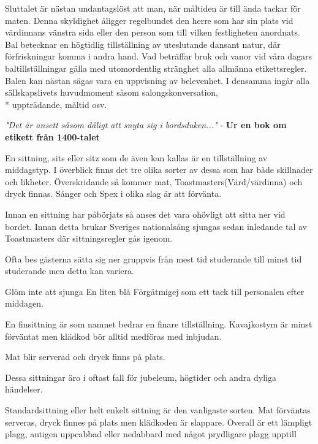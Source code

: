 Sluttalet är nästan undantagslöst att man, när måltiden är till ända tackar för maten. Denna skyldighet åligger regelbundet den herre som har sin plats vid värdinnans vänstra sida eller den person som till vilken festligheten anordnats.
\filbreak
{}
Bal betecknar en högtidlig tillställning av uteslutande dansant natur, där förfriskningar komma i andra hand. Vad beträffar bruk och vanor vid våra dagars baltillställningar gälla med utomordentlig stränghet alla allmänna etikettsregler. Balen kan nästan sägas vara en uppvisning av belevenhet. I densamma ingår alla sällskapslivets huvudmoment såsom salongskonversation,\\* uppträdande, måltid osv.

\textit{"Det är ansett såsom dåligt att snyta sig i bordsduken..."} - \textbf{Ur en bok om etikett från 1400-talet}
\filbreak
{}

En sittning, sits eller sitz som de även kan kallas är en tillställning av middagstyp. I överblick finns det tre olika sorter av dessa som har både skillnader och likheter. Överskridande så kommer mat, Toastmasters(Värd/värdinna) och dryck finnas. Sånger och Spex i olika slag är att förvänta.

Innan en sittning har påbörjats så anses det vara ohövligt att sitta ner vid bordet. Innan detta brukar Sveriges nationalsång sjungas sedan inledande tal av Toastmasters där sittningsregler gås igenom.

Ofta bes gästerna sätta sig ner gruppvis från mest tid studerande till minst tid studerande men detta kan variera.

Glöm inte att sjunga En liten blå Förgätmigej som ett tack till personalen efter middagen.


En finsittning är som namnet bedrar en finare tillställning. Kavajkostym är minst förväntat men klädkod bör alltid medföras med inbjudan.

Mat blir serverad och dryck finns på plats.

Dessa sittningar äro i oftast fall för jubeleum, högtider och andra dyliga händelser.


Standardsittning eller helt enkelt sittning är den vanligaste sorten. Mat förväntas serveras, dryck finnes på plats men klädkoden är slappare. Overall är ett lämpligt plagg, antigen uppcabbad eller nedabbard med något prydligare plagg upptill


